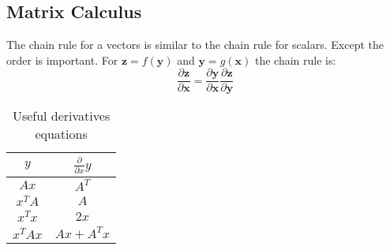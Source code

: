 \subsection*{Matrix Calculus}

The chain rule for a vectors is similar to the chain rule for scalars. Except the order is important. For $\mathbf{z} = f(\mathbf{y})$ and $\mathbf{y} = g(\mathbf{x}) $ the chain rule is:
\begin{equation}
    \frac{\partial \mathbf{z}}{\partial \mathbf{x}} = \frac{\partial \mathbf{y}}{\partial \mathbf{x}}     \frac{\partial \mathbf{z}}{\partial \mathbf{y}}
\end{equation}




\begin{table}[h]
    \centering
    \begin{tabular}{cc}
        \toprule
            $y$ & $\frac{\partial}{\partial x} y$ \\
        \midrule
            $Ax$     & $A^T$ \\
            $x^T A$  & $A$   \\
            $x^T x$  & $2x$  \\  
            $x^T Ax$ & $Ax + A^Tx$  \\          
        \bottomrule
    \end{tabular}
    \caption{Useful derivatives equations}
\end{table}